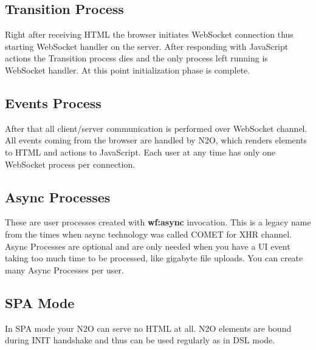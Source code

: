 \subsection{Transition Process}
Right after receiving HTML the browser initiates WebSocket connection
thus starting WebSocket handler on the server. After responding with
JavaScript actions the Transition process dies and the only process left
running is WebSocket handler. At this point initialization phase is complete.

\subsection{Events Process}
After that all client/server communication is performed over
WebSocket channel. All events coming from the browser are
handled by N2O, which renders elements to HTML and actions to
JavaScript. Each user at any time has only one WebSocket process
per connection.

\subsection{Async Processes}
These are user processes created with {\bf wf:async} invocation.
This is a legacy name from the times when async technology
was called COMET for XHR channel. Async Processes are optional
and are only needed when you have a UI event taking too much
time to be processed, like gigabyte file uploads. You can create
many Async Processes per user.

\subsection{SPA Mode}
In SPA mode your N2O can serve no HTML at all. N2O elements are
bound during INIT handshake and thus can be used regularly as in DSL mode.

\

